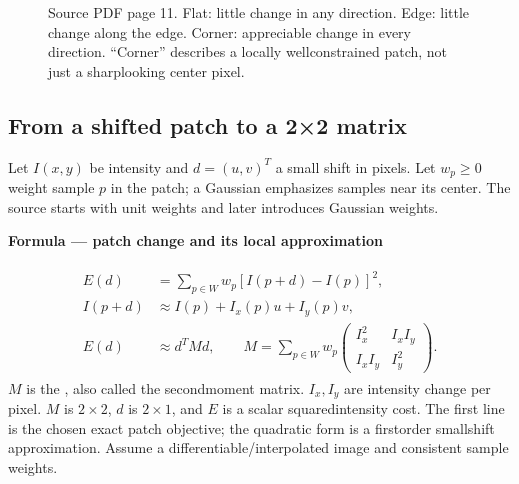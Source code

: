 \documentclass[letterpaper,11pt,english,openany,oneside]{jupyterBook}
\begin{document}
\begin{figure}[H]
\centering
\capstart

\noindent{}
\caption{Source PDF page 11. Flat: little change in any direction. Edge: little change along the edge. Corner: appreciable change in every direction. “Corner” describes a locally well\sphinxhyphen{}constrained patch, not just a sharp\sphinxhyphen{}looking center pixel.}\label{\detokenize{lectures/lecture05/corners:fig-lec05-patches}}\end{figure}


\subsection{From a shifted patch to a 2×2 matrix}
\label{\detokenize{lectures/lecture05/corners:from-a-shifted-patch-to-a-22-matrix}}
\sphinxAtStartPar
Let \(I(x,y)\) be intensity and \(d=(u,v)^T\) a small shift in pixels. Let \(w_p\ge0\) weight sample \(p\) in the patch; a Gaussian emphasizes samples near its center. The source starts with unit weights and later introduces Gaussian weights.

\begin{TextbookBox}
\textbf{Formula — patch change and its local approximation}\par\smallskip
\begin{equation}\label{equation:lectures/lecture05/corners:eq-lec05-patch-energy}
\begin{split}\begin{aligned}
E(d)&=\sum_{p\in W}w_p[I(p+d)-I(p)]^2,\\
I(p+d)&\approx I(p)+I_x(p)u+I_y(p)v,\\
E(d)&\approx d^TMd,\qquad
M=\sum_{p\in W}w_p
\begin{pmatrix}I_x^2&I_xI_y\\I_xI_y&I_y^2\end{pmatrix}.
\end{aligned}\end{split}
\end{equation}
\sphinxAtStartPar
\(M\) is the , also called the second\sphinxhyphen{}moment matrix. \(I_x,I_y\) are intensity change per pixel. \(M\) is \(2\times2\), \(d\) is \(2\times1\), and \(E\) is a scalar squared\sphinxhyphen{}intensity cost. The first line is the chosen exact patch objective; the quadratic form is a first\sphinxhyphen{}order small\sphinxhyphen{}shift approximation. Assume a differentiable/interpolated image and consistent sample weights.

\end{TextbookBox}
\end{document}
